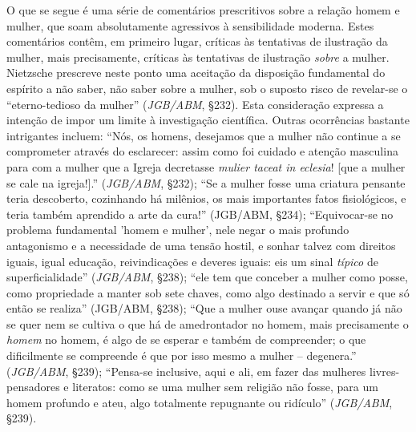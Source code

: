 \documentclass[
	12pt,				%
	openright,			%
	oneside,			%
	a4paper,			%
	english,			%
	french,				%
	spanish,			%
	brazil				%
	]{abntex2}
\begin{document}
O que se segue é uma série de comentários prescritivos sobre a relação homem e mulher, que soam absolutamente agressivos à sensibilidade moderna. Estes comentários contêm, em primeiro lugar, críticas às tentativas de ilustração da mulher, mais precisamente, críticas às tentativas de ilustração \textit{sobre} a mulher. Nietzsche prescreve neste ponto uma aceitação da disposição fundamental do espírito a não saber, não saber sobre a mulher, sob o suposto risco de revelar-se o “eterno-tedioso da mulher” (\textit{JGB/ABM}, §232). Esta consideração expressa a intenção de impor um limite à investigação científica. Outras ocorrências bastante intrigantes incluem: “Nós, os homens, desejamos que a mulher não continue a se comprometer através do esclarecer: assim como foi cuidado e atenção masculina para com a mulher que a Igreja decretasse \textit{mulier taceat in eclesia}! [que a mulher se cale na igreja!].” (\textit{JGB/ABM}, §232); “Se a mulher fosse uma criatura pensante teria descoberto, cozinhando há milênios, os mais importantes fatos fisiológicos, e teria também aprendido a arte da cura!” (JGB/ABM, §234); “Equivocar-se no problema fundamental 'homem e mulher', nele negar o mais profundo antagonismo e a necessidade de uma tensão hostil, e sonhar talvez com direitos iguais, igual educação, reivindicações e deveres iguais: eis um sinal \textit{típico} de superficialidade” (\textit{JGB/ABM}, §238); “ele tem que conceber a mulher como posse, como propriedade a manter sob sete chaves, como algo destinado a servir e que só então se realiza” (JGB/ABM, §238); “Que a mulher ouse avançar quando já não se quer nem se cultiva o que há de amedrontador no homem, mais precisamente o \textit{homem} no homem, é algo de se esperar e também de compreender; o que dificilmente se compreende é que por isso mesmo a mulher – degenera.” (\textit{JGB/ABM}, §239); “Pensa-se inclusive, aqui e ali, em fazer das mulheres livres-pensadores e literatos: como se uma mulher sem religião não fosse, para um homem profundo e ateu, algo totalmente repugnante ou ridículo” (\textit{JGB/ABM}, §239).
\end{document}
